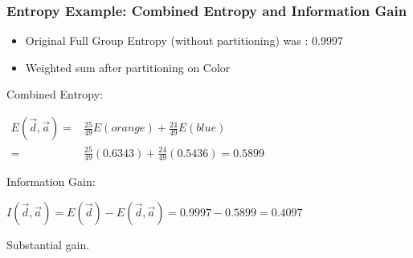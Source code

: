 \begin{frame}[fragile]\frametitle{Entropy Example: Combined Entropy and Information Gain}
\begin{itemize}
\item Original Full Group Entropy (without partitioning) was : 0.9997
\item Weighted sum after partitioning on Color
\end{itemize}
Combined Entropy:
\begin{center}
\footnotesize
$\displaystyle \begin{aligned}
E(\vec{d},\vec{a}) = {}& \frac{25}{49}E(orange) + \frac{24}{49}E(blue) \\
= {}& \frac{25}{49}(0.6343) + \frac{24}{49}(0.5436) = 0.5899
\end{aligned}$
\end{center}
Information Gain:
\begin{center}
\footnotesize
$\displaystyle I(\vec{d},\vec{a}) = E(\vec{d}) - E(\vec{d},\vec{a}) = 0.9997 - 0.5899 = 0.4097$
\end{center}
Substantial gain.
\end{frame}






